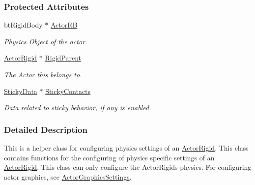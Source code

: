 \subsubsection*{Protected Attributes}
\begin{DoxyCompactItemize}
\item 
\hypertarget{classMezzanine_1_1ActorRigidPhysicsSettings_a6b8383d096105187418886ac0f28daf3}{
btRigidBody $\ast$ \hyperlink{classMezzanine_1_1ActorRigidPhysicsSettings_a6b8383d096105187418886ac0f28daf3}{ActorRB}}
\label{classMezzanine_1_1ActorRigidPhysicsSettings_a6b8383d096105187418886ac0f28daf3}

\begin{DoxyCompactList}\small\item\em Physics Object of the actor. \item\end{DoxyCompactList}\item 
\hypertarget{classMezzanine_1_1ActorRigidPhysicsSettings_ac83840161a9a88ecdcbacfa3c204bd6e}{
\hyperlink{classMezzanine_1_1ActorRigid}{ActorRigid} $\ast$ \hyperlink{classMezzanine_1_1ActorRigidPhysicsSettings_ac83840161a9a88ecdcbacfa3c204bd6e}{RigidParent}}
\label{classMezzanine_1_1ActorRigidPhysicsSettings_ac83840161a9a88ecdcbacfa3c204bd6e}

\begin{DoxyCompactList}\small\item\em The Actor this belongs to. \item\end{DoxyCompactList}\item 
\hypertarget{classMezzanine_1_1ActorRigidPhysicsSettings_a8ddca7ae371cae162657763543f970bb}{
\hyperlink{structMezzanine_1_1StickyData}{StickyData} $\ast$ \hyperlink{classMezzanine_1_1ActorRigidPhysicsSettings_a8ddca7ae371cae162657763543f970bb}{StickyContacts}}
\label{classMezzanine_1_1ActorRigidPhysicsSettings_a8ddca7ae371cae162657763543f970bb}

\begin{DoxyCompactList}\small\item\em Data related to sticky behavior, if any is enabled. \item\end{DoxyCompactList}\end{DoxyCompactItemize}


\subsubsection{Detailed Description}
This is a helper class for configuring physics settings of an \hyperlink{classMezzanine_1_1ActorRigid}{ActorRigid}. This class contains functions for the configuring of physics specific settings of an \hyperlink{classMezzanine_1_1ActorRigid}{ActorRigid}. This class can only configure the ActorRigids physics. For configuring actor graphics, see \hyperlink{classMezzanine_1_1ActorGraphicsSettings}{ActorGraphicsSettings}. 

